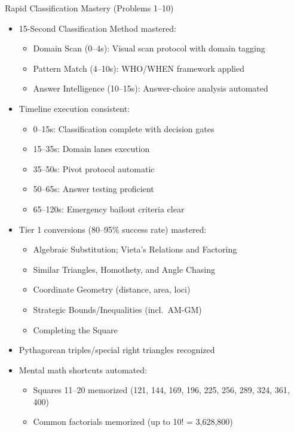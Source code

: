\documentclass{article}
\begin{document}
\begin{masterybox}{Rapid Classification Mastery (Problems 1--10)}
\begin{itemize}[nosep]
\item[$\square$] 15-Second Classification Method mastered:
  \begin{itemize}[nosep]
  \item[$\square$] Domain Scan (0--4s): Visual scan protocol with domain tagging
  \item[$\square$] Pattern Match (4--10s): WHO/WHEN framework applied
  \item[$\square$] Answer Intelligence (10--15s): Answer-choice analysis automated
  \end{itemize}
\item[$\square$] Timeline execution consistent:
  \begin{itemize}[nosep]
  \item[$\square$] 0--15s: Classification complete with decision gates
  \item[$\square$] 15--35s: Domain lanes execution
  \item[$\square$] 35--50s: Pivot protocol automatic
  \item[$\square$] 50--65s: Answer testing proficient
  \item[$\square$] 65--120s: Emergency bailout criteria clear
  \end{itemize}
\item[$\square$] Tier 1 conversions (80--95\% success rate) mastered:
  \begin{itemize}[nosep]
  \item[$\square$] Algebraic Substitution; Vieta's Relations and Factoring
  \item[$\square$] Similar Triangles, Homothety, and Angle Chasing
  \item[$\square$] Coordinate Geometry (distance, area, loci)
  \item[$\square$] Strategic Bounds/Inequalities (incl.\ AM-GM)
  \item[$\square$] Completing the Square
  \end{itemize}
\item[$\square$] Pythagorean triples/special right triangles recognized
\item[$\square$] Mental math shortcuts automated:
  \begin{itemize}[nosep]
  \item[$\square$] Squares 11--20 memorized (121, 144, 169, 196, 225, 256, 289, 324, 361, 400)
  \item[$\square$] Common factorials memorized (up to 10! = 3,628,800)

\end{itemize}
\end{itemize}
\end{masterybox}
\end{document}
